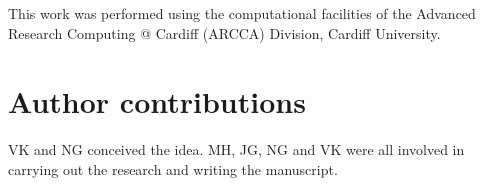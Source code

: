 \documentclass[a4paper]{article}
\begin{document}
This work was performed using the computational facilities of the Advanced
Research Computing @ Cardiff (ARCCA) Division, Cardiff University.

\section*{Author contributions}

VK and NG conceived the idea. MH, JG, NG and VK were all involved in carrying
out the research and writing the manuscript.

\printbibliography




\end{document}
